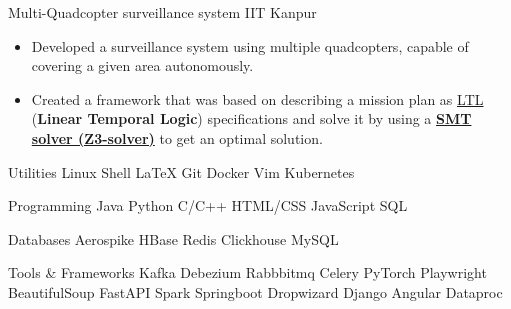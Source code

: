 \documentclass[a4paper]{MagicalCV}
\begin{document}
\begin{minipage}[t]{0.49\textwidth}
\begin{cventries}
\cventry
   {}
   {Multi-Quadcopter surveillance system}
   {IIT Kanpur}
   {}
   {
   \vspace{-3mm}
   \vspace*{-\baselineskip}
    \begin{itemize}[leftmargin=6mm]
        \item {Developed a surveillance system using multiple quadcopters, capable of covering a given area autonomously.}
        \item {Created a framework that was based on describing a mission plan as \href{https://en.wikipedia.org/wiki/Linear_temporal_logic}{LTL} (\textbf{Linear Temporal Logic}) specifications and solve it by using a \href{https://pypi.org/project/z3-solver/}{\textbf{SMT solver (Z3-solver)}}  to get an optimal solution.}
    \end{itemize}
   }
\end{cventries}



\vspace*{-\baselineskip}
\begin{cventries}

    \cventry
       {Utilities}
       {}
       {}
       {}
       {
        Linux Shell \textbullet{} \LaTeX \textbullet{} Git \textbullet{} Docker \textbullet{} Vim \textbullet{} Kubernetes
       }

\vspace{2mm}

    \cventry
       {Programming}
       {}
       {}
       {}
       {
        Java \textbullet{} Python \textbullet{} C/C++ \textbullet{} HTML/CSS  \textbullet{}
        JavaScript \textbullet{} SQL  
       }

\vspace{2mm}

    \cventry
        {Databases}
        {}
        {}
        {}
        {
         Aerospike \textbullet{} HBase \textbullet{} Redis \textbullet{} Clickhouse \textbullet{} MySQL
        }

\vspace{2mm}

    \cventry
       {Tools \& Frameworks}
       {}
       {}
       {}
       {
        Kafka \textbullet{} Debezium \textbullet{} Rabbbitmq \textbullet{} Celery \textbullet{} PyTorch \newline Playwright \textbullet{} BeautifulSoup  \textbullet{} FastAPI \textbullet{} Spark  \textbullet{} Springboot Dropwizard \textbullet{} Django \textbullet{} Angular \textbullet{} Dataproc
       }


\end{cventries}
\end{minipage}
\end{document}

